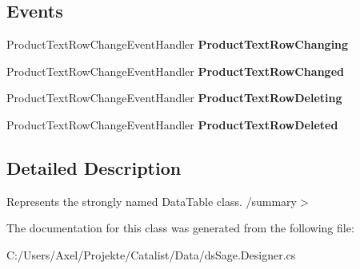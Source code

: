 \subsection*{Events}
\begin{DoxyCompactItemize}
\item 
Product\+Text\+Row\+Change\+Event\+Handler {\bfseries Product\+Text\+Row\+Changing}\hypertarget{class_products_1_1_data_1_1ds_sage_1_1_product_text_data_table_a19f09690b2b35b5460160264bf570834}{}\label{class_products_1_1_data_1_1ds_sage_1_1_product_text_data_table_a19f09690b2b35b5460160264bf570834}

\item 
Product\+Text\+Row\+Change\+Event\+Handler {\bfseries Product\+Text\+Row\+Changed}\hypertarget{class_products_1_1_data_1_1ds_sage_1_1_product_text_data_table_a74cefcb5720011d659951e45ebc3737d}{}\label{class_products_1_1_data_1_1ds_sage_1_1_product_text_data_table_a74cefcb5720011d659951e45ebc3737d}

\item 
Product\+Text\+Row\+Change\+Event\+Handler {\bfseries Product\+Text\+Row\+Deleting}\hypertarget{class_products_1_1_data_1_1ds_sage_1_1_product_text_data_table_ab15ebed1a0a3e69ac7608eb16ba60bd9}{}\label{class_products_1_1_data_1_1ds_sage_1_1_product_text_data_table_ab15ebed1a0a3e69ac7608eb16ba60bd9}

\item 
Product\+Text\+Row\+Change\+Event\+Handler {\bfseries Product\+Text\+Row\+Deleted}\hypertarget{class_products_1_1_data_1_1ds_sage_1_1_product_text_data_table_a8c40aa6d73c5a69848e89fb0457d9357}{}\label{class_products_1_1_data_1_1ds_sage_1_1_product_text_data_table_a8c40aa6d73c5a69848e89fb0457d9357}

\end{DoxyCompactItemize}


\subsection{Detailed Description}
Represents the strongly named Data\+Table class. /summary$>$ 

The documentation for this class was generated from the following file\+:\begin{DoxyCompactItemize}
\item 
C\+:/\+Users/\+Axel/\+Projekte/\+Catalist/\+Data/ds\+Sage.\+Designer.\+cs\end{DoxyCompactItemize}
